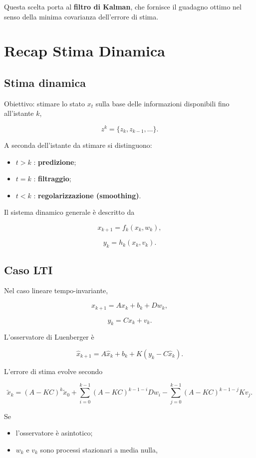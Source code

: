 \documentclass[11pt,a4paper]{article}
\begin{document}
Questa scelta porta al \textbf{filtro di Kalman}, che fornisce il guadagno ottimo nel senso della minima covarianza dell'errore di stima.

\section{Recap Stima Dinamica}

\subsection*{Stima dinamica}

Obiettivo: stimare lo stato $x_t$ sulla base delle informazioni disponibili fino all'istante $k$,

\[
z^k=\{z_k,z_{k-1},\ldots\}.
\]

A seconda dell'istante da stimare si distinguono:

\begin{itemize}
    \item $t>k$ : \textbf{predizione};
    \item $t=k$ : \textbf{filtraggio};
    \item $t<k$ : \textbf{regolarizzazione (smoothing)}.
\end{itemize}

Il sistema dinamico generale è descritto da

\[
x_{k+1}=f_k(x_k,w_k),
\]

\[
y_k=h_k(x_k,v_k).
\]

\subsection*{Caso LTI}

Nel caso lineare tempo-invariante,

\[
x_{k+1}=Ax_k+b_k+Dw_k,
\]

\[
y_k=Cx_k+v_k.
\]

L'osservatore di Luenberger è

\[
\hat{x}_{k+1}
=
A\hat{x}_k
+b_k
+
K\left(y_k-C\hat{x}_k\right).
\]

L'errore di stima evolve secondo

\[
\tilde{x}_k
=
(A-KC)^k\tilde{x}_0
+
\sum_{i=0}^{k-1}
(A-KC)^{k-1-i}Dw_i
-
\sum_{j=0}^{k-1}
(A-KC)^{k-1-j}Kv_j.
\]

Se

\begin{itemize}
    \item l'osservatore è asintotico;
    \item $w_k$ e $v_k$ sono processi stazionari a media nulla,
\end{itemize}
\end{document}

